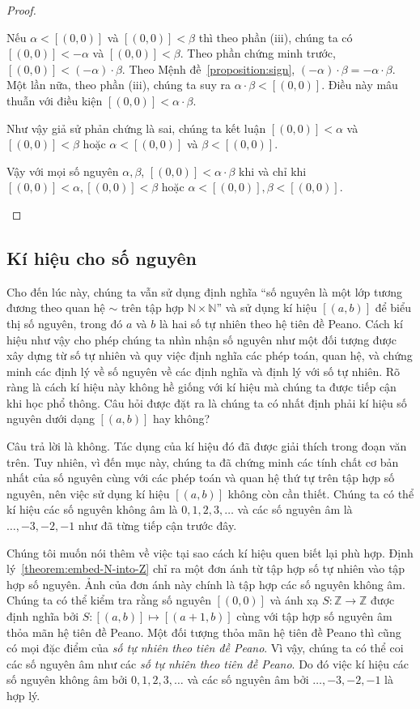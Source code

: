 \begin{proof}
\begin{enumerate}[label={(\roman*)}]
		      Nếu $\alpha < [(0,0)]$ và $[(0,0)] < \beta$ thì theo phần (iii), chúng ta có $[(0,0)] < -\alpha$ và $[(0,0)] < \beta$. Theo phần chứng minh trước, $[(0,0)] < (-\alpha)\cdot\beta$. Theo Mệnh đề~\ref{proposition:sign}, $(-\alpha)\cdot\beta = -\alpha\cdot\beta$. Một lần nữa, theo phần (iii), chúng ta suy ra $\alpha\cdot\beta < [(0,0)]$. Điều này mâu thuẫn với điều kiện $[(0,0)] < \alpha\cdot\beta$.

		      Như vậy giả sử phản chứng là sai, chúng ta kết luận $[(0,0)] < \alpha$ và $[(0,0)] < \beta$ hoặc $\alpha < [(0,0)]$ và $\beta < [(0,0)]$.

		      Vậy với mọi số nguyên $\alpha, \beta$, $[(0,0)] < \alpha\cdot \beta$ khi và chỉ khi $[(0,0)] < \alpha, [(0,0)] < \beta$ hoặc $\alpha < [(0,0)], \beta < [(0,0)]$.
	\end{enumerate}
\end{proof}

\subsection*{Kí hiệu cho số nguyên}

Cho đến lúc này, chúng ta vẫn sử dụng định nghĩa ``số nguyên là một lớp tương đương theo quan hệ $\sim$ trên tập hợp $\mathbb{N}\times\mathbb{N}$'' và sử dụng kí hiệu $[(a, b)]$ để biểu thị số nguyên, trong đó $a$ và $b$ là hai số tự nhiên theo hệ tiên đề Peano. Cách kí hiệu như vậy cho phép chúng ta nhìn nhận số nguyên như một đối tượng được xây dựng từ số tự nhiên và quy việc định nghĩa các phép toán, quan hệ, và chứng minh các định lý về số nguyên về các định nghĩa và định lý với số tự nhiên. Rõ ràng là cách kí hiệu này không hề giống với kí hiệu mà chúng ta được tiếp cận khi học phổ thông. Câu hỏi được đặt ra là chúng ta có nhất định phải kí hiệu số nguyên dưới dạng $[(a, b)]$ hay không?

Câu trả lời là không. Tác dụng của kí hiệu đó đã được giải thích trong đoạn văn trên. Tuy nhiên, vì đến mục này, chúng ta đã chứng minh các tính chất cơ bản nhất của số nguyên cùng với các phép toán và quan hệ thứ tự trên tập hợp số nguyên, nên việc sử dụng kí hiệu $[(a, b)]$ không còn cần thiết. Chúng ta có thể kí hiệu các số nguyên không âm là $0, 1, 2, 3,\ldots$ và các số nguyên âm là $\ldots, -3, -2, -1$ như đã từng tiếp cận trước đây.

Chúng tôi muốn nói thêm về việc tại sao cách kí hiệu quen biết lại phù hợp. Định lý~\ref{theorem:embed-N-into-Z} chỉ ra một đơn ánh từ tập hợp số tự nhiên vào tập hợp số nguyên. Ảnh của đơn ánh này chính là tập hợp các số nguyên không âm. Chúng ta có thể kiểm tra rằng số nguyên $[(0,0)]$ và ánh xạ $S: \mathbb{Z}\to\mathbb{Z}$ được định nghĩa bởi $S: [(a,b)] \mapsto [(a+1,b)]$ cùng với tập hợp số nguyên âm thỏa mãn hệ tiên đề Peano. Một đối tượng thỏa mãn hệ tiên đề Peano thì cũng có mọi đặc điểm của \textit{số tự nhiên theo tiên đề Peano}. Vì vậy, chúng ta có thể coi các số nguyên âm như các \textit{số tự nhiên theo tiên đề Peano}. Do đó việc kí hiệu các số nguyên không âm bởi $0, 1, 2, 3,\ldots$ và các số nguyên âm bởi $\ldots, -3, -2, -1$ là hợp lý.

